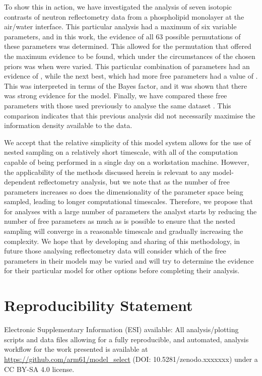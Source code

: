 \documentclass[
 reprint,
 superscriptaddress,
 amsmath,amssymb,
 aps,
]{revtex4-2}
\begin{document}
To show this in action, we have investigated the analysis of seven isotopic contrasts of neutron reflectometry data from a phospholipid monolayer at the air/water interface. 
This particular analysis had a maximum of six variable parameters, and in this work, the evidence of all \num{63} possible permutations of these parameters was determined. 
This allowed for the permutation that offered the maximum evidence to be found, which under the circumstances of the chosen priors was when  were varied. 
This particular combination of parameters had an evidence of , while the next best, which had more free parameters had a value of . 
This was interpreted in terms of the Bayes factor, and it was shown that there was strong evidence for the  model.  
Finally, we have compared these free parameters with those used previously to analyse the same dataset \cite{mccluskey_assessing_2019}. 
This comparison indicates that this previous analysis did not necessarily maximise the information density available to the data. 

We accept that the relative simplicity of this model system allows for the use of nested sampling on a relatively short timescale, with all of the computation capable of being performed in a single day on a workstation machine. 
However, the applicability of the methods discussed herein is relevant to any model-dependent reflectometry analysis, but we note that as the number of free parameters increases so does the dimensionality of the parameter space being sampled, leading to longer computational timescales. 
Therefore, we propose that for analyses with a large number of parameters the analyst starts by reducing the number of free parameters as much as is possible to ensure that the nested sampling will converge in a reasonable timescale and gradually increasing the complexity. 
We hope that by developing and sharing of this methodology, in future those analysing reflectometry data will consider which of the free parameters in their models may be varied and will try to determine the evidence for their particular model for other options before completing their analysis. 

\section*{Reproducibility Statement}

Electronic Supplementary Information (ESI) available: All analysis/plotting scripts and data files allowing for a fully reproducible, and automated, analysis workflow for the work presented is available at \url{https://github.com/arm61/model_select} (DOI: 10.5281/zenodo.xxxxxxx) under a CC BY-SA 4.0 license.
\end{document}
